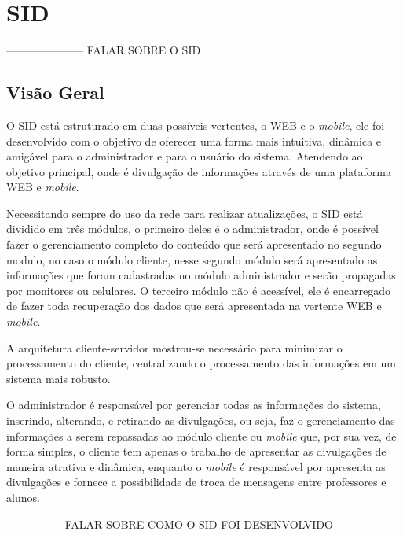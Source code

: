 \chapter[SID]{SID}
--------------------- FALAR SOBRE O SID

\section{Visão Geral}
O SID está estruturado em duas possíveis vertentes, o WEB e o \textit{mobile}, ele foi desenvolvido com o objetivo de oferecer uma forma mais intuitiva, dinâmica e amigável para o administrador e para o usuário do sistema. Atendendo ao objetivo principal, onde é divulgação de informações através de uma plataforma WEB e \textit{mobile}.

Necessitando sempre do uso da rede para realizar atualizações, o SID está dividido em três módulos, o primeiro deles é o administrador, onde é possível fazer o gerenciamento completo do conteúdo que será apresentado no segundo modulo, no caso o módulo cliente, nesse segundo módulo será apresentado as informações que foram cadastradas no módulo
administrador e serão propagadas por monitores ou celulares. O terceiro módulo não é acessível, ele é encarregado de fazer toda recuperação dos dados que será apresentada na vertente WEB e \textit{mobile}.

A arquitetura cliente-servidor mostrou-se necessário para minimizar o processamento do cliente, centralizando o processamento das informações em um sistema mais robusto.

O administrador é responsável por gerenciar todas as informações do sistema, inserindo, alterando, e retirando as divulgações, ou seja, faz o gerenciamento das informações a serem repassadas ao módulo cliente ou \textit{mobile} que, por sua vez, de forma simples, o cliente tem apenas o trabalho de apresentar as divulgações de maneira atrativa e dinâmica, enquanto o \textit{mobile} é responsável por apresenta as divulgações e fornece a possibilidade de troca de mensagens entre professores e alunos. 


--------------- FALAR SOBRE COMO O SID FOI DESENVOLVIDO

